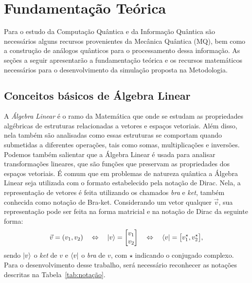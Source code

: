 
\chapter{Fundamentação Teórica}

Para o estudo da Computação Quântica e da Informação Quântica são necessários alguns recursos provenientes da Mecânica Quântica (MQ), bem como a construção de análogos quânticos para o processamento dessa informação. As seções a seguir apresentarão a fundamentação teórica e os recursos matemáticos necessários para o desenvolvimento da simulação proposta na Metodologia.

\section{Conceitos básicos de Álgebra Linear}\label{sec:algelin}

A \textit{Álgebra Linear} é o ramo da Matemática que onde se estudam as propriedades algébricas de estruturas relacionadas a vetores e espaços vetoriais. Além disso, nela também são analisadas como essas estruturas se comportam quando submetidas a diferentes operações, tais como somas, multiplicações e inversões. Podemos também salientar que a Álgebra Linear é usada para analisar transformações lineares, que são funções que preservam as propriedades dos espaços vetoriais. É comum que em problemas de natureza quântica a Álgebra Linear seja utilizada com o formato estabelecido pela notação de Dirac. Nela, a representação de vetores é feita utilizando os chamados \textit{bra} e \textit{ket}, também conhecida como notação de Bra-ket. Considerando um vetor qualquer \(\vec{v}\), sua representação pode ser feita na forma matricial e na notação de Dirac da seguinte forma:
\begin{equation}
\vec{v}= (v_1, v_2) \quad\Leftrightarrow\quad \ket{v} = \begin{bmatrix} v_1 \\ v_2 \end{bmatrix} \quad\Leftrightarrow\quad \bra{v} = \bigl[
v_1^{\star}, v_2^{\star} \bigr],
\end{equation}
sendo $\ket{v}$ o \textit{ket} de $v$ e $\bra{v}$ o \textit{bra} de $v$, com \(\star\) indicando o conjugado complexo. Para o desenvolvimento desse trabalho, será necessário reconhecer as notações descritas na Tabela~\ref{tab:notação}.

